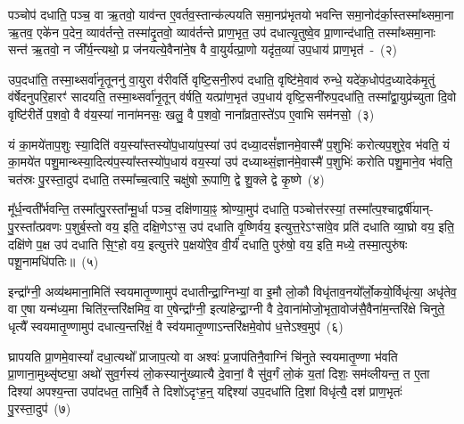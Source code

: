 पञ्चोप॑ दधाति॒ पञ्च॒ वा ऋ॒तवो॒ याव॑न्त ए॒वर्तव॒स्तान्क॑ल्पयति समा॒नप्र॑भृतयो भवन्ति समा॒नोद॑र्का॒स्तस्मा᳚थ्समा॒ना ऋ॒तव॒ एके॑न प॒देन॒ व्याव॑र्तन्ते॒ तस्मा॑दृ॒तवो॒ व्याव॑र्तन्ते प्राण॒भृत॒ उप॑ दधात्यृ॒तुष्वे॒व प्रा॒णान्द॑धाति॒ तस्मा᳚थ्समा॒नाः सन्त॑ ऋ॒तवो॒ न जी᳚र्य॒न्त्यथो॒ प्र ज॑नयत्ये॒वैना॑ने॒ष वै वा॒युर्यत्प्रा॒णो यदृ॑त॒व्या॑ उप॒धाय॑ प्राण॒भृत॑~-~(२)\ip

उप॒\-दधा॑ति॒ तस्मा॒थ्सर्वा॑नृ॒तूननु॑ वा॒युरा व॑रीवर्ति वृष्टि॒सनी॒रुप॑ दधाति॒ वृष्टि॑मे॒वाव॑ रुन्धे॒ यदे॑क॒धोप॑द॒ध्यादेक॑मृ॒तुं व॑र्\mbox{}षेदनुपरि॒हारꣳ॑ सादयति॒ तस्मा॒थ्सर्वा॑नृ॒तून् व॑र्\mbox{}षति॒ यत्प्रा॑ण॒भृत॑ उप॒धाय॑ वृष्टि॒सनी॑रुप॒\-दधा॑ति॒ तस्मा᳚द्\-वा॒युप्र॑च्युता दि॒वो वृष्टि॑रीर्ते प॒शवो॒ वै व॑य॒स्या॑ नाना॑मनसः॒ खलु॒ वै प॒शवो॒ नाना᳚व्रता॒स्ते॑\-ऽप ए॒वाभि सम॑नसो॒~(३)\ip

यं का॒मये॑ताप॒शुः स्या॒दिति॑ वय॒स्या᳚स्तस्यो॑प॒धाया॑प॒स्या॑ उप॑ दध्या॒दसं᳚ज्ञानमे॒वास्मै॑ प॒शुभिः॑ करोत्यप॒शुरे॒व भ॑वति॒ यं का॒मये॑त पशु॒मान्थ्स्या॒दित्य॑प॒स्या᳚स्तस्यो॑प॒धाय॑ वय॒स्या॑ उप॑ दध्याथ्सं॒ज्ञान॑मे॒वास्मै॑ प॒शुभिः॑ करोति पशु॒माने॒व भ॑वति॒ चत॑स्रः पु॒रस्ता॒दुप॑ दधाति॒ तस्मा᳚च्च॒त्वारि॒ चक्षु॑षो रू॒पाणि॒ द्वे शु॒क्ले द्वे कृ॒ष्णे~(४)\ip

मू᳚र्ध॒न्वती᳚र्भवन्ति॒ तस्मा᳚त्पु॒रस्ता᳚न्मू॒र्धा पञ्च॒ दक्षि॑णाया॒ꣴ॒ श्रोण्या॒मुप॑ दधाति॒ पञ्चोत्त॑रस्यां॒ तस्मा᳚त्प॒श्चाद्वर्\mbox{}षी॑यान्-पु॒रस्ता᳚त्प्रवणः प॒शुर्ब॒स्तो वय॒ इति॒ दक्षि॒णे\-ऽꣳस॒ उप॑ दधाति वृ॒ष्णिर्वय॒ इत्युत्त॒रे\-ऽꣳसा॑वे॒व प्रति॑ दधाति व्या॒घ्रो वय॒ इति॒ दक्षि॑णे प॒क्ष उप॑ दधाति सि॒ꣳ॒हो वय॒ इत्युत्त॑रे प॒क्षयो॑रे॒व वी॒र्यं॑ दधाति॒ पुरु॑षो॒ वय॒ इति॒ मध्ये॒ तस्मा॒त्पुरु॑षः पशू॒नामधि॑\-पतिः॥~(५)\ip

{\anuvakamend[{कॢप्त्या॑ उप॒धाय॑ प्राण॒भृतः॒ सम॑नसः कृ॒ष्णे पुरु॑षो॒ वय॒ इति॒ पञ्च॑ च}]}

इन्द्रा᳚ग्नी॒ अव्य॑थमाना॒मिति॑ स्वयमा\-तृ॒ण्णामुप॑ दधातीन्द्रा॒ग्निभ्यां॒ वा इ॒मौ लो॒कौ विधृ॑ताव॒नयो᳚र्लो॒कयो॒र्विधृ॑त्या॒ अधृ॑तेव॒ वा ए॒षा यन्म॑ध्य॒मा चिति॑र॒न्तरि॑क्षमिव॒ वा ए॒षेन्द्रा᳚ग्नी॒ इत्या॑हेन्द्रा॒ग्नी वै दे॒वाना॑मोजो॒भृता॒वोज॑सै॒वैना॑\-म॒न्तरि॑क्षे चिनुते॒ धृत्यै᳚ स्वयमा\-तृ॒ण्णामुप॑ दधात्य॒न्तरि॑क्षं॒ वै स्व॑यमातृ॒ण्णा\-ऽन्तरि॑क्षमे॒वोप॑ ध॒त्ते\-ऽश्व॒मुप॑~(६)\ip

घ्रापयति प्रा॒णमे॒वास्यां᳚ दधा॒त्यथो᳚ प्राजाप॒त्यो वा अश्वः॑ प्र॒जा\-प॑तिनै॒वाग्निं चि॑नुते स्वयमा\-तृ॒ण्णा भ॑वति प्रा॒णाना॒मुथ्सृ॑ष्ट्या॒ अथो॑ सुव॒र्गस्य॑ लो॒कस्यानु॑ख्यात्यै दे॒वानां॒ वै सु॑व॒र्गं लो॒कं य॒तां दिशः॒ सम॑व्लीयन्त॒ त ए॒ता दिश्या॑ अपश्य॒न्ता उपा॑दधत॒ ताभि॒र्वै ते दिशो॑\-ऽदृꣳह॒न्॒ यद्दिश्या॑ उप॒\-दधा॑ति दि॒शां विधृ॑त्यै॒ दश॑ प्राण॒भृतः॑ पु॒रस्ता॒दुप॑~(७)\ip

